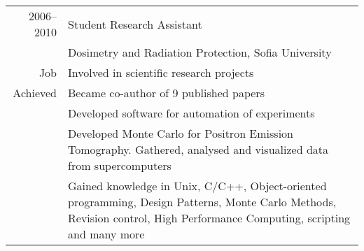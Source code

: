 \begin{tabular}{ r p{} }
2006--2010 & Student Research Assistant \\
           & Dosimetry and Radiation Protection, Sofia University\\
       Job & Involved in scientific research projects\\
Achieved   & Became co-author of 9 published papers\\
           & Developed software for automation of experiments\\
           & Developed Monte Carlo for Positron Emission Tomography. Gathered, analysed and visualized data from supercomputers\\
           & Gained knowledge in Unix, C/C++, Object-oriented programming, Design Patterns, Monte Carlo Methods, Revision control, High Performance Computing, scripting and many more\\
\end{tabular}\\
